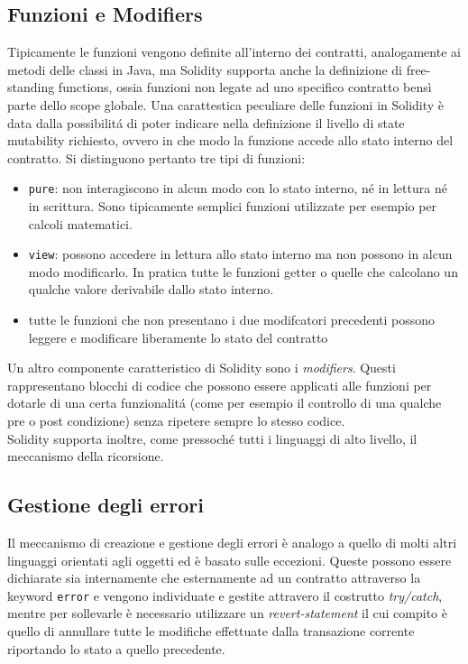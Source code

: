 \documentclass[12pt,a4paper,openright,oneside]{report}
\theoremstyle{definition}
\begin{document}
\subsection{Funzioni e Modifiers}\label{bg:solidity:func_and_mod}
Tipicamente le funzioni vengono definite all'interno dei contratti, analogamente ai metodi delle classi in Java, ma Solidity supporta anche la definizione di free-standing functions, ossia funzioni non legate ad uno specifico contratto bens\`{i} parte dello scope globale. Una carattestica peculiare delle funzioni in Solidity \`{e} data dalla possibilit\'{a} di poter indicare nella definizione il livello di state mutability richiesto, ovvero in che modo la funzione accede allo stato interno del contratto. Si distinguono pertanto tre tipi di funzioni:
\begin{itemize}
    \item \texttt{pure}: non interagiscono in alcun modo con lo stato interno, n\'{e} in lettura n\'{e} in scrittura. Sono tipicamente semplici funzioni utilizzate per esempio per calcoli matematici.
    \item \texttt{view}: possono accedere in lettura allo stato interno ma non possono in alcun modo modificarlo. In pratica tutte le funzioni getter o quelle che calcolano un qualche valore derivabile dallo stato interno.
    \item tutte le funzioni che non presentano i due modifcatori precedenti possono leggere e modificare liberamente lo stato del contratto
\end{itemize}
Un altro componente caratteristico di Solidity sono i \textit{modifiers}. Questi rappresentano blocchi di codice che possono essere applicati alle funzioni per dotarle di una certa funzionalit\'{a} (come per esempio il controllo di una qualche pre o post condizione) senza ripetere sempre lo stesso codice.\\
Solidity supporta inoltre, come pressoch\'{e} tutti i linguaggi di alto livello, il meccanismo della ricorsione.

\subsection{Gestione degli errori}\label{bg:solidity:errors}
Il meccanismo di creazione e gestione degli errori \`{e} analogo a quello di molti altri linguaggi orientati agli oggetti ed \`{e} basato sulle eccezioni. Queste possono essere dichiarate sia internamente che esternamente ad un contratto attraverso la keyword \texttt{error} e vengono individuate e gestite attravero il costrutto \textit{try/catch}, mentre per sollevarle \`{e} necessario utilizzare un \textit{revert-statement} il cui compito \`{e} quello di annullare tutte le modifiche effettuate dalla transazione corrente riportando lo stato a quello precedente. 
\end{document}
